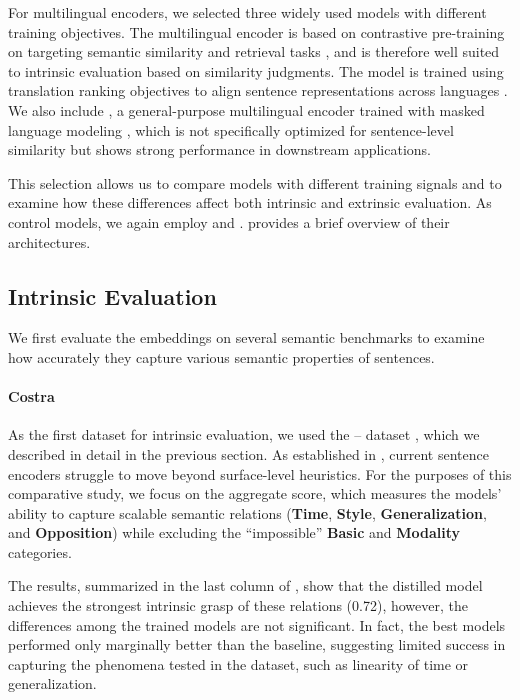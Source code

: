 For multilingual encoders, we selected three widely used models with different training objectives. The multilingual \mepet encoder is based on contrastive pre-training on targeting semantic similarity and retrieval tasks \citep{wang2024multilingual}, and is therefore well suited to intrinsic evaluation based on similarity judgments. The \labse model is trained using translation ranking objectives to align sentence representations across languages \citep{feng-etal-2022-language}. We also include \xlmr, a general-purpose multilingual encoder trained with masked language modeling \citep{xlm-r}, which is not specifically optimized for sentence-level similarity but shows strong performance in downstream applications.

This selection allows us to compare models with different training signals and to examine how these differences affect both intrinsic and extrinsic evaluation.  As control models, we again employ \randombert and \random.  provides a brief overview of their architectures.

\subsection{Intrinsic Evaluation}
We first evaluate the embeddings on several semantic benchmarks to examine how accurately they capture various semantic properties of sentences.

\paragraph{Costra}
\noindent
As the first dataset for intrinsic evaluation, we used the \costra-- dataset \citep{costra11}, which we described in detail in the previous section. As established in , current sentence encoders struggle to move beyond surface-level heuristics. For the purposes of this comparative study, we focus on the \costraminus aggregate score, which measures the models' ability to capture scalable semantic relations (\textbf{Time}, \textbf{Style}, \textbf{Generalization}, and \textbf{Opposition}) while excluding the ``impossible'' \textbf{Basic} and \textbf{Modality} categories.

The results, summarized in the last column of , show that the distilled \simcse model achieves the strongest intrinsic grasp of these relations (0.72), however, the differences among the trained models are not significant. In fact, the best models performed only marginally better than the \randombert baseline, suggesting limited success in capturing the phenomena tested in the \costra dataset, such as linearity of time or generalization. 

